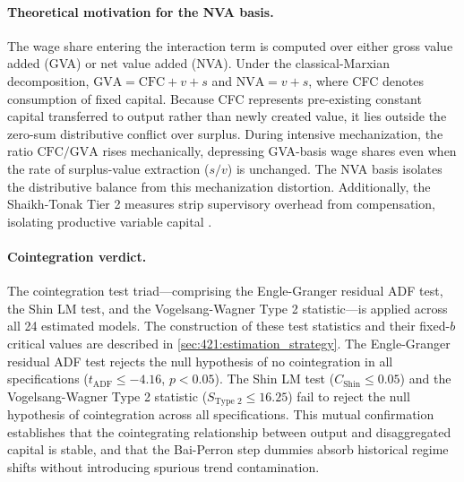 \paragraph{Theoretical motivation for the NVA basis.}
The wage share entering the interaction term is computed over either
gross value added (GVA) or net value added (NVA). Under the
classical-Marxian decomposition, $\text{GVA} = \text{CFC} + v + s$
and $\text{NVA} = v + s$, where CFC denotes consumption of fixed
capital. Because CFC represents pre-existing constant capital
transferred to output rather than newly created value, it lies
outside the zero-sum distributive conflict over surplus. During
intensive mechanization, the ratio $\text{CFC}/\text{GVA}$ rises
mechanically, depressing GVA-basis wage shares even when the rate of
surplus-value extraction ($s/v$) is unchanged. The NVA basis
isolates the distributive balance from this mechanization
distortion. Additionally, the Shaikh-Tonak Tier 2 measures strip
supervisory overhead from compensation, isolating productive
variable capital \citep{ShaikhTonak1994}.

\paragraph{Cointegration verdict.}
The cointegration test triad---comprising the Engle-Granger
residual ADF test, the Shin \citeyearpar{Shin1994} LM test, and
the Vogelsang-Wagner Type 2 statistic---is applied across all 24
estimated models. The construction of these test statistics and
their fixed-$b$ critical values are described in
\cref{sec:421:estimation_strategy}. The Engle-Granger residual ADF
test rejects the null hypothesis of no cointegration in all
specifications ($t_{\text{ADF}} \leq -4.16$, $p < 0.05$). The Shin
LM test ($C_{\text{Shin}} \leq 0.05$) and the Vogelsang-Wagner
Type 2 statistic ($S_{\text{Type 2}} \leq 16.25$) fail to reject
the null hypothesis of cointegration across all specifications. This
mutual confirmation establishes that the cointegrating relationship
between output and disaggregated capital is stable, and that the
Bai-Perron step dummies absorb historical regime shifts without
introducing spurious trend contamination.

